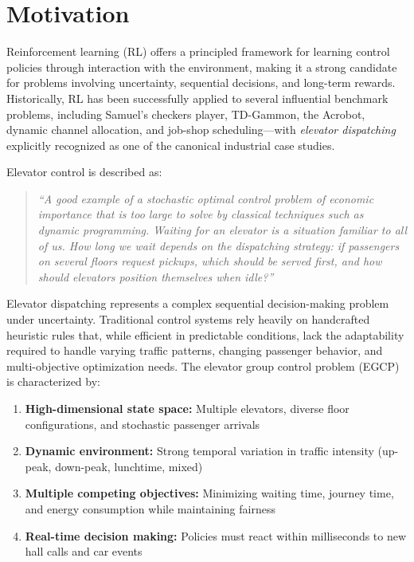 \documentclass[10pt,twocolumn]{article}
\begin{document}
\section{Motivation}
Reinforcement learning (RL) offers a principled framework for learning control policies through interaction with the environment, making it a strong candidate for problems involving uncertainty, sequential decisions, and long-term rewards. Historically, RL has been successfully applied to several influential benchmark problems, including Samuel’s checkers player, TD-Gammon, the Acrobot, dynamic channel allocation, and job-shop scheduling---with \emph{elevator dispatching} explicitly recognized as one of the canonical industrial case studies. 

Elevator control is described as:
\begin{quote}
\emph{``A good example of a stochastic optimal control problem of economic importance that is too large to solve by classical techniques such as dynamic programming. Waiting for an elevator is a situation familiar to all of us. How long we wait depends on the dispatching strategy: if passengers on several floors request pickups, which should be served first, and how should elevators position themselves when idle?''}~\cite{MARK2005}
\end{quote}

Elevator dispatching represents a complex sequential decision-making problem under uncertainty. Traditional control systems rely heavily on handcrafted heuristic rules that, while efficient in predictable conditions, lack the adaptability required to handle varying traffic patterns, changing passenger behavior, and multi-objective optimization needs. The elevator group control problem (EGCP) is characterized by:
\begin{enumerate}
    \item \textbf{High-dimensional state space:} Multiple elevators, diverse floor configurations, and stochastic passenger arrivals
    \item \textbf{Dynamic environment:} Strong temporal variation in traffic intensity (up-peak, down-peak, lunchtime, mixed)
    \item \textbf{Multiple competing objectives:} Minimizing waiting time, journey time, and energy consumption while maintaining fairness
    \item \textbf{Real-time decision making:} Policies must react within milliseconds to new hall calls and car events
\end{enumerate}
\end{document}
